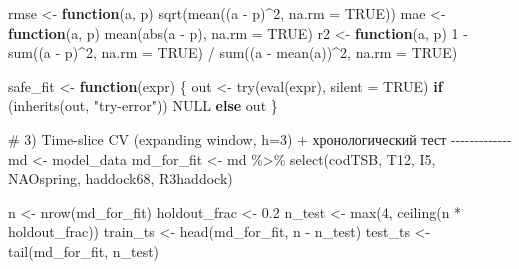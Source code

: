 \documentclass[
  letterpaper,
  DIV=11,
  numbers=noendperiod]{scrreprt}
\newenvironment{Shaded}{\begin{snugshade}}{\end{snugshade}}
\newcommand{\AttributeTok}[1]{\textcolor[rgb]{0.40,0.45,0.13}{#1}}
\newcommand{\CommentTok}[1]{\textcolor[rgb]{0.37,0.37,0.37}{#1}}
\newcommand{\ConstantTok}[1]{\textcolor[rgb]{0.56,0.35,0.01}{#1}}
\newcommand{\ControlFlowTok}[1]{\textcolor[rgb]{0.00,0.23,0.31}{\textbf{#1}}}
\newcommand{\DecValTok}[1]{\textcolor[rgb]{0.68,0.00,0.00}{#1}}
\newcommand{\FloatTok}[1]{\textcolor[rgb]{0.68,0.00,0.00}{#1}}
\newcommand{\FunctionTok}[1]{\textcolor[rgb]{0.28,0.35,0.67}{#1}}
\newcommand{\NormalTok}[1]{\textcolor[rgb]{0.00,0.23,0.31}{#1}}
\newcommand{\OtherTok}[1]{\textcolor[rgb]{0.00,0.23,0.31}{#1}}
\newcommand{\SpecialCharTok}[1]{\textcolor[rgb]{0.37,0.37,0.37}{#1}}
\newcommand{\StringTok}[1]{\textcolor[rgb]{0.13,0.47,0.30}{#1}}
\begin{document}
\begin{Shaded}
\begin{Highlighting}[]
\NormalTok{rmse }\OtherTok{\textless{}{-}} \ControlFlowTok{function}\NormalTok{(a, p) }\FunctionTok{sqrt}\NormalTok{(}\FunctionTok{mean}\NormalTok{((a }\SpecialCharTok{{-}}\NormalTok{ p)}\SpecialCharTok{\^{}}\DecValTok{2}\NormalTok{, }\AttributeTok{na.rm =} \ConstantTok{TRUE}\NormalTok{))}
\NormalTok{mae  }\OtherTok{\textless{}{-}} \ControlFlowTok{function}\NormalTok{(a, p) }\FunctionTok{mean}\NormalTok{(}\FunctionTok{abs}\NormalTok{(a }\SpecialCharTok{{-}}\NormalTok{ p), }\AttributeTok{na.rm =} \ConstantTok{TRUE}\NormalTok{)}
\NormalTok{r2   }\OtherTok{\textless{}{-}} \ControlFlowTok{function}\NormalTok{(a, p) }\DecValTok{1} \SpecialCharTok{{-}} \FunctionTok{sum}\NormalTok{((a }\SpecialCharTok{{-}}\NormalTok{ p)}\SpecialCharTok{\^{}}\DecValTok{2}\NormalTok{, }\AttributeTok{na.rm =} \ConstantTok{TRUE}\NormalTok{) }\SpecialCharTok{/} \FunctionTok{sum}\NormalTok{((a }\SpecialCharTok{{-}} \FunctionTok{mean}\NormalTok{(a))}\SpecialCharTok{\^{}}\DecValTok{2}\NormalTok{, }\AttributeTok{na.rm =} \ConstantTok{TRUE}\NormalTok{)}

\NormalTok{safe\_fit }\OtherTok{\textless{}{-}} \ControlFlowTok{function}\NormalTok{(expr) \{}
\NormalTok{  out }\OtherTok{\textless{}{-}} \FunctionTok{try}\NormalTok{(}\FunctionTok{eval}\NormalTok{(expr), }\AttributeTok{silent =} \ConstantTok{TRUE}\NormalTok{)}
  \ControlFlowTok{if}\NormalTok{ (}\FunctionTok{inherits}\NormalTok{(out, }\StringTok{"try{-}error"}\NormalTok{)) }\ConstantTok{NULL} \ControlFlowTok{else}\NormalTok{ out}
\NormalTok{\}}


\CommentTok{\# 3) Time{-}slice CV (expanding window, h=3) + хронологический тест {-}{-}{-}{-}{-}{-}{-}{-}{-}{-}{-}{-}{-}}
\NormalTok{md }\OtherTok{\textless{}{-}}\NormalTok{ model\_data}
\NormalTok{md\_for\_fit }\OtherTok{\textless{}{-}}\NormalTok{ md }\SpecialCharTok{\%\textgreater{}\%} \FunctionTok{select}\NormalTok{(codTSB, T12, I5, NAOspring, haddock68, R3haddock)}

\NormalTok{n }\OtherTok{\textless{}{-}} \FunctionTok{nrow}\NormalTok{(md\_for\_fit)}
\NormalTok{holdout\_frac }\OtherTok{\textless{}{-}} \FloatTok{0.2}
\NormalTok{n\_test }\OtherTok{\textless{}{-}} \FunctionTok{max}\NormalTok{(}\DecValTok{4}\NormalTok{, }\FunctionTok{ceiling}\NormalTok{(n }\SpecialCharTok{*}\NormalTok{ holdout\_frac))}
\NormalTok{train\_ts }\OtherTok{\textless{}{-}} \FunctionTok{head}\NormalTok{(md\_for\_fit, n }\SpecialCharTok{{-}}\NormalTok{ n\_test)}
\NormalTok{test\_ts  }\OtherTok{\textless{}{-}} \FunctionTok{tail}\NormalTok{(md\_for\_fit, n\_test)}


\end{Highlighting}
\end{Shaded}
\end{document}
